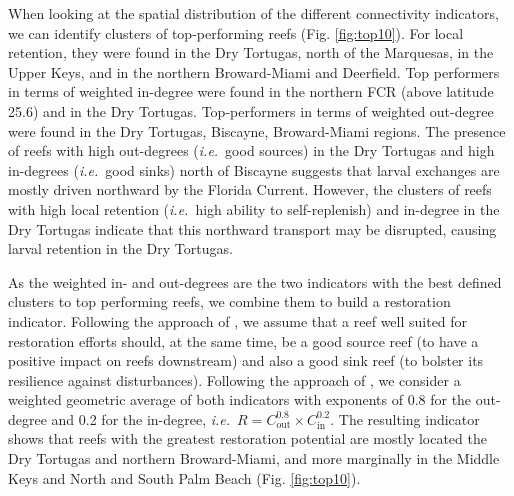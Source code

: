 \documentclass[preprint,12pt,authoryear]{elsarticle}
\newcommand{\ie}{{\it i.e.}\ }
\begin{document}
	When looking at the spatial distribution of the different connectivity indicators, we can identify clusters of top-performing reefs (Fig. \ref{fig:top10}). For local retention, they were found in the Dry Tortugas, north of the Marquesas, in the Upper Keys, and in the northern Broward-Miami and Deerfield. Top performers in terms of weighted in-degree were found in the northern FCR (above latitude 25.6) and in the Dry Tortugas. Top-performers in terms of weighted out-degree were found in the Dry Tortugas, Biscayne, Broward-Miami regions. The presence of reefs with high out-degrees (\ie good sources) in the Dry Tortugas and high in-degrees (\ie good sinks) north of Biscayne suggests that larval exchanges are mostly driven northward by the Florida Current. However, the clusters of reefs with high local retention (\ie high ability to self-replenish) and in-degree in the Dry Tortugas indicate that this northward transport may be disrupted, causing larval retention in the Dry Tortugas.
	
	As the weighted in- and out-degrees are the two indicators with the best defined clusters to top performing reefs, we combine them to build a restoration indicator. Following the approach of \cite{frys2020fine}, we assume that a reef well suited for restoration efforts should, at the same time, be a good source reef (to have a positive impact on reefs downstream) and also a good sink reef (to bolster its resilience against disturbances). Following the approach of \cite{tnc2024}, we consider a weighted geometric average of both indicators with exponents of 0.8 for the out-degree and 0.2 for the in-degree, \ie $R = C_\text{out}^{0.8} \times C_\text{in}^{0.2}$. The resulting indicator shows that reefs with the greatest restoration potential are mostly located the Dry Tortugas and northern Broward-Miami, and more marginally in the Middle Keys and North and South Palm Beach (Fig. \ref{fig:top10}).
	
\end{document}
